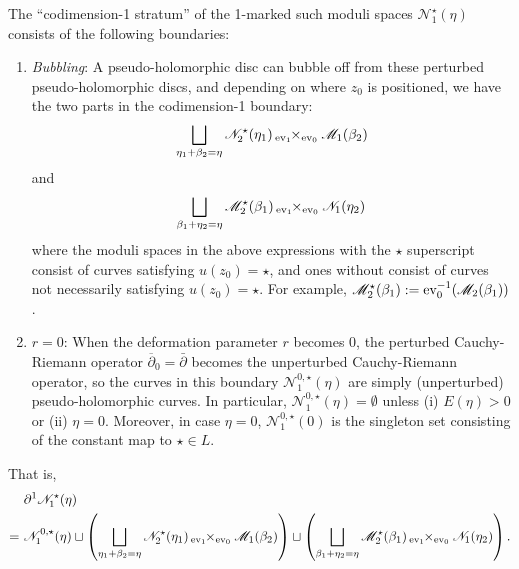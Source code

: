 \documentclass[10pt]{amsart}
\numberwithin{equation}{section}
\theoremstyle{plain}
\theoremstyle{definition}
\theoremstyle{remark}
\numberwithin{equation}{section}
\newcommand{\ev}{\textup{ev}}
\newcommand{\ol}[1]{\overline{#1}}
\newcommand{\ms}[1]{\mathscr{#1}}
\newcommand{\fiberprod}[2]{\,_{#1}\!\!\times_{#2} }
\begin{document}
{The ``codimension-1 stratum'' of the 1-marked such moduli spaces $\ms{N}^\star_1(\eta)$ consists of the following boundaries:
\begin{enumerate}
	\item \emph{Bubbling}: A pseudo-holomorphic disc can bubble off from these perturbed pseudo-holomorphic discs, and depending on where $z_0$ is positioned, we have the two parts in the codimension-1 boundary: \begin{align}\label{Eq: Pert Codim1 Part1}
		\bigsqcup_{\eta_1+\beta_2=\eta}\ms{N}_2^\star(\eta_1) \fiberprod{\ev_1}{\ev_0} \ms{M}_1(\beta_2)	\end{align}
		and \begin{align}\label{Eq: Pert Codim1 Part2}
			 \bigsqcup_{\beta_1+\eta_2=\eta} \ms{M}_2^\star(\beta_1) \fiberprod{\ev_1}{\ev_0} \ms{N}_1(\eta_2) 
		\end{align}
	where the moduli spaces in the above expressions with the $\star$ superscript consist of curves satisfying $u(z_0)=\star$, and ones without consist of curves not necessarily satisfying $u(z_0)=\star$. For example, $\ms{M}_2^\star(\beta_1):= \ev_0^{-1}(\ms{M}_2(\beta_1))$.
	\item \emph{$r=0$}: When the deformation parameter $r$ becomes 0, the perturbed Cauchy-Riemann operator $\ol{\partial}_0=\bar\partial$ becomes the unperturbed Cauchy-Riemann operator, so the curves in this boundary $\ms{N}_1^{0,\star}(\eta)$ are simply (unperturbed) pseudo-holomorphic curves. In particular, $\ms{N}_1^{0,\star}(\eta)=\emptyset$ unless (i) $E(\eta)>0$ or (ii) $\eta = 0$. Moreover, in case $\eta=0$, $\ms{N}_1^{0,\star}(0)$ is the singleton set consisting of the constant map to $\star\in L$.
\end{enumerate}
That is, 
\begin{align}\label{Eq: Pert Codim1Bdry}
	&\partial^1 \ms{N}_1^\star(\eta) \\ =\,\, &\ms{N}_1^{0,\star}(\eta) \sqcup 		\left(\bigsqcup_{\eta_1+\beta_2=\eta}\ms{N}_2^\star(\eta_1) \fiberprod{\ev_1}{\ev_0} \ms{M}_1(\beta_2)\right) \sqcup \left( \bigsqcup_{\beta_1+\eta_2=\eta} \ms{M}_2^\star(\beta_1) \fiberprod{\ev_1}{\ev_0} \ms{N}_1(\eta_2) \right).\nonumber
\end{align}

}
\end{document}
